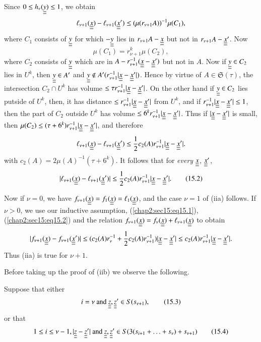 Since $0 \leq h_{\nu} (\underline{\underline{y}}) \leq 1$, we obtain
$$
\ell_{\nu+1} (\underline{\underline{x}}) - \ell_{\nu+1} (\underline{\underline{x}}') \leq (\mu(r_{\nu+1} A))^{-1} \mu(C_{1}),
$$
where $C_{1}$ consists of $\underline{\underline{y}}$ for which $-\underline{\underline{y}}$ lies in $r_{\nu+1} A - \underline{\underline{x}}$ but not in $r_{\nu+1} A - \underline{\underline{x}}'$. Now
$$
\mu(C_{1}) = r_{\nu+1}^{k} \mu(C_{2}),
$$
where $C_{2}$ consists of $\underline{\underline{y}}$ which are in $A - r_{\nu+1}^{-1} (\underline{\underline{x}} - \underline{\underline{x}}')$ but not in $A$. Now if $\underline{\underline{y}} \in C_{2}$ lies in $U^{k}$, then $\underline{\underline{y}} \in A'$ and $\underline{\underline{y}} \notin A'(r_{\nu+1}^{-1} |\underline{\underline{x}} - \underline{\underline{x}}'|)$. Hence by virtue of $A \in \mathfrak{S} (\tau)$, the intersection $C_{2} \cap U^{k}$ has volume $\leq \tau r_{\nu+1}^{-1} |\underline{\underline{x}} - \underline{\underline{x}}'|$. On the other hand if $\underline{\underline{y}} \in C_{2}$ lies putside of $U^{k}$, then, it has distance $\leq r_{\nu+1}^{-1} |\underline{\underline{x}} - \underline{\underline{x}}'|$ from $U^{k}$, and if $r_{\nu+1}^{-1} |\underline{\underline{x}} - \underline{\underline{x}}'| \leq 1$, then the part of $C_{2}$ outside $U^{k}$ has volume $\leq 6^{k} r_{\nu+1}^{-1} |\underline{\underline{x}} - \underline{\underline{x}}'|$. Thus if $|\underline{\underline{x}} - \underline{\underline{x}}'|$ is small, then $\mu(C_{2}) \leq (\tau + 6^{k}) r_{\nu+1}^{-1} |\underline{\underline{x}} - \underline{\underline{x}}'|$, and therefore
$$
\ell_{\nu+1} (\underline{\underline{x}}) - \ell_{\nu+1} (\underline{\underline{x}}') \leq \frac{1}{2} c_{2} (A) r_{\nu+1}^{-1} |\underline{\underline{x}} - \underline{\underline{x}}'|.
$$
with $c_{2}(A) = 2\mu(A)^{-1} (\tau + 6^{k})$. It follows that for {\em every} $\underline{\underline{x}}$, $\underline{\underline{x}}'$,
\begin{equation*}
|\ell_{\nu+1} (\underline{\underline{x}}) - \ell_{\nu+1} (\underline{\underline{x}}')| \leq \frac{1}{2} c_{2} (A) r_{\nu+1}^{-1} |\underline{\underline{x}} - \underline{\underline{x}}'|.\tag{15.2}\label{chap2:sec15:eq15.2}
\end{equation*}

Now if $\nu = 0$, we have $f_{\nu+1}(\underline{\underline{x}}) = f_{1}(\underline{\underline{x}}) = \ell_{1} (\underline{\underline{x}})$, and the case $\nu = 1$ of (iia) follows. If $\nu > 0$, we use our inductive assumption, (\ref{chap2:sec15:eq15.1}), (\ref{chap2:sec15:eq15.2}) and the relation $f_{\nu+1} (\underline{\underline{x}}) = f_{\nu}(\underline{\underline{x}}) + \ell_{\nu+1} (\underline{\underline{x}})$ to obtain
$$
|f_{\nu+1} (\underline{\underline{x}}) - f_{\nu+1} (\underline{\underline{x}}')| \leq (c_{2}(A) r_{\nu}^{-1} + \frac{1}{2} c_{2} (A) r_{\nu+1}^{-1}) |\underline{\underline{x}} - \underline{\underline{x}}'| \leq c_{2} (A) r_{\nu+1}^{-1} |\underline{\underline{x}} - \underline{\underline{x}}'|.
$$\pageoriginale
Thus (iia) is true for $\nu + 1$.

Before taking up the proof of (iib) we observe the following.

Suppose that either
\begin{equation*}
i = \nu \text{ and } \underline{\underline{z}}, \underline{\underline{z}}' \in S(s_{\nu + 1}), \tag{15.3}\label{chap2:sec15:eq15.3}
\end{equation*}
or that
\begin{equation*}
1 \leq i \leq \nu - 1, |\underline{\underline{z}} - \underline{\underline{z}}'| \text{ and } \underline{\underline{z}}, \underline{\underline{z}}' \in S(3(s_{i+1} + \ldots + s_{\nu}) + s_{\nu+1})\tag{15.4}\label{chap2:sec15:eq15.4}
\end{equation*}

